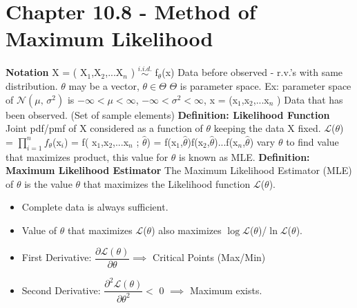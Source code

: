 \documentclass[]{article}
\begin{document}
\section{Chapter 10.8 - Method of Maximum Likelihood}
\Large\textbf{Notation}
\newline X = ( X$_1$,X$_2$,...X$_n$ )  $\stackrel{i.i.d.}{\sim}$ f$_\theta$(x)  \newline Data before observed - r.v.'s with same distribution.
\newline $\theta$ may be a vector, $\theta \in \Theta$
\newline $\Theta$ is parameter space.  Ex: parameter space of $\mathcal{N}(\mu,\,\sigma^{2})$ is $-\infty < \mu < \infty$, $-\infty < \sigma^2 < \infty$,
\newline x = (x$_1$,x$_2$,...x$_n$ )   Data that has been observed. (Set of sample elements)
\newline
\newline 
\Large\textbf{Definition: Likelihood Function}
\newline Joint pdf/pmf of X considered as a function of $\theta$ keeping the data X fixed.
\newline
\newline $\mathcal{L}$($\theta$) = $\displaystyle\prod_{i=1}^{n} f_\theta$(x$_i$)  =  f( x$_1$,x$_2$,...x$_n$ ; $\hat\theta$) = f(x$_1$,$\hat\theta$)f(x$_2$,$\hat\theta$)...f(x$_n$,$\hat\theta$)
\newline
\newline vary $\theta$ to find value that maximizes product, this value for $\theta$ is known as MLE.
\newline
\newline
\Large\textbf{Definition: Maximum Likelihood Estimator}
\newline The Maximum Likelihood Estimator (MLE) of $\theta$ is the value $\theta$ that maximizes the Likelihood function $\mathcal{L}$($\theta$).
\begin{itemize}
	\item Complete  data is always sufficient.
	\item Value of $\theta$ that maximizes $\mathcal{L}$($\theta$) also maximizes $\log\mathcal{L}$($\theta$)/$\ln\mathcal{L}$($\theta$). 	
	\item First Derivative: $\dfrac{\partial\mathcal{L}(\theta)  }{\partial\theta} \implies$ Critical Points (Max/Min)
	\item Second Derivative: $\dfrac{\partial^2\mathcal{L}(\theta)  }{\partial\theta^2} < $ 0 $\implies$  Maximum exists.\newline
\end{itemize}
\end{document}
